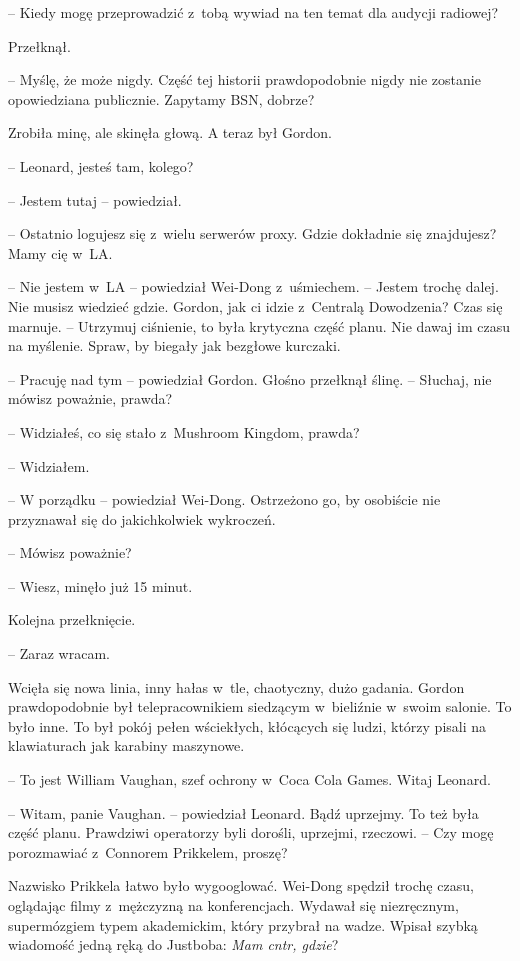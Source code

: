 \documentclass[oneside,polish,11pt,rmheadings]{mwbk}
\begin{document}
-- Kiedy mogę przeprowadzić z~tobą wywiad na ten temat dla audycji radiowej?

Przełknął. 

-- Myślę, że może nigdy. Część tej historii prawdopodobnie nigdy nie zostanie opowiedziana publicznie. Zapytamy BSN, dobrze?

Zrobiła minę, ale skinęła głową. A teraz był Gordon.

-- Leonard, jesteś tam, kolego? 

-- Jestem tutaj -- powiedział.

-- Ostatnio logujesz się z~wielu serwerów proxy. Gdzie dokładnie się znajdujesz? Mamy cię w~LA.

-- Nie jestem w~LA -- powiedział Wei-Dong z~uśmiechem. -- Jestem trochę dalej. Nie musisz wiedzieć gdzie. Gordon, jak ci idzie z~Centralą Dowodzenia? Czas się marnuje. -- Utrzymuj ciśnienie, to była krytyczna część planu. Nie dawaj im czasu na myślenie. Spraw, by biegały jak bezgłowe kurczaki.

-- Pracuję nad tym -- powiedział Gordon. Głośno przełknął ślinę. -- Słuchaj, nie mówisz poważnie, prawda?

-- Widziałeś, co się stało z~Mushroom Kingdom, prawda? 

-- Widziałem. 

-- W porządku -- powiedział Wei-Dong. Ostrzeżono go, by osobiście nie przyznawał się do jakichkolwiek wykroczeń.

-- Mówisz poważnie? 

-- Wiesz, minęło już 15 minut.

Kolejna przełknięcie. 

-- Zaraz wracam. 

Wcięła się nowa linia, inny hałas w~tle, chaotyczny, dużo gadania. Gordon prawdopodobnie był telepracownikiem siedzącym w~bieliźnie w~swoim salonie. To było inne. To był pokój pełen wściekłych, kłócących się ludzi, którzy pisali na klawiaturach jak karabiny maszynowe.

-- To jest William Vaughan, szef ochrony w~Coca Cola Games. Witaj Leonard.

-- Witam, panie Vaughan. -- powiedział Leonard. Bądź uprzejmy. To też była część planu. Prawdziwi operatorzy byli dorośli, uprzejmi, rzeczowi. -- Czy mogę porozmawiać z~Connorem Prikkelem, proszę? 

 Nazwisko Prikkela łatwo było wygooglować. Wei-Dong spędził trochę czasu, oglądając filmy z~mężczyzną na konferencjach. Wydawał się niezręcznym, supermózgiem typem akademickim, który przybrał na wadze. Wpisał szybką wiadomość jedną ręką do Justboba: \textit{Mam cntr, gdzie}? 
\end{document}
